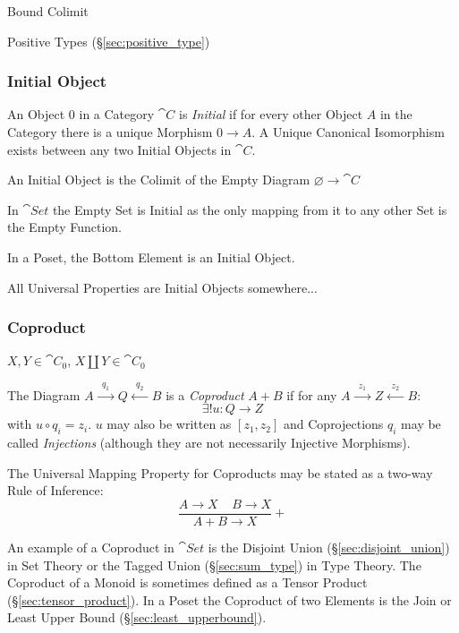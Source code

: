 Bound Colimit %

Positive Types (\S\ref{sec:positive_type})



\subsubsection{Initial Object}\label{sec:initial_object}

An Object $0$ in a Category $\cat{C}$ is \emph{Initial} if for
every other Object $A$ in the Category there is a unique Morphism $0
\rightarrow A$. A Unique Canonical Isomorphism exists between any two
Initial Objects in $\cat{C}$.

An Initial Object is the Colimit of the Empty Diagram $\varnothing
\rightarrow \cat{C}$

In $\cat{Set}$ the Empty Set is Initial as the only mapping from it
to any other Set is the Empty Function.

In a Poset, the Bottom Element is an Initial Object.

All Universal Properties are Initial Objects somewhere...



\subsubsection{Coproduct}\label{sec:coproduct}

$X,Y \in \cat{C}_0$, $X \amalg Y \in \cat{C}_0$

The Diagram $A \xrightarrow{\;\;q_1\;\;} Q \xleftarrow{\;\;q_2\;\;} B$
is a \emph{Coproduct} $A + B$ if for any $A \xrightarrow{\;\;z_1\;\;}
Z \xleftarrow{\;\;z_2\;\;} B$:
\[
  \exists!u : Q \rightarrow Z
\]
with $u \circ q_i = z_i$. $u$ may also be written as $[ z_1, z_2 ]$
and Coprojections $q_i$ may be called \emph{Injections} (although they
are not necessarily Injective Morphisms).

The Universal Mapping Property for Coproducts may be stated as a
two-way Rule of Inference:
\[
  {
    \frac{A \rightarrow X \;\;\;\; B \rightarrow X}
    {A + B \rightarrow X}
  }+
\]

An example of a Coproduct in $\cat{Set}$ is the Disjoint Union
(\S\ref{sec:disjoint_union}) in Set Theory or the Tagged Union
(\S\ref{sec:sum_type}) in Type Theory. The Coproduct of a Monoid is
sometimes defined as a Tensor Product (\S\ref{sec:tensor_product}). In
a Poset the Coproduct of two Elements is the Join or Least Upper Bound
(\S\ref{sec:least_upperbound}).

